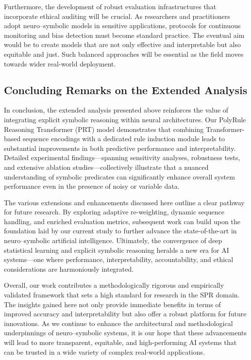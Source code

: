 \documentclass{article}
\begin{document}
Furthermore, the development of robust evaluation infrastructures that incorporate ethical auditing will be crucial. As researchers and practitioners adopt neuro–symbolic models in sensitive applications, protocols for continuous monitoring and bias detection must become standard practice. The eventual aim would be to create models that are not only effective and interpretable but also equitable and just. Such balanced approaches will be essential as the field moves towards wider real-world deployment.

\subsection*{Concluding Remarks on the Extended Analysis}
In conclusion, the extended analysis presented above reinforces the value of integrating explicit symbolic reasoning within neural architectures. Our PolyRule Reasoning Transformer (PRT) model demonstrates that combining Transformer-based sequence encodings with a dedicated rule induction module leads to substantial improvements in both predictive performance and interpretability. Detailed experimental findings—spanning sensitivity analyses, robustness tests, and extensive ablation studies—collectively illustrate that a nuanced understanding of symbolic predicates can significantly enhance overall system performance even in the presence of noisy or variable data.

The various extensions and enhancements discussed here outline a clear pathway for future research. By exploring adaptive re-weighting, dynamic sequence handling, and enriched evaluation metrics, subsequent work can build upon the foundation laid by our current study to further advance the state-of-the-art in neuro–symbolic artificial intelligence. Ultimately, the convergence of deep statistical learning and explicit symbolic reasoning heralds a new era for AI systems—one where performance, interpretability, accountability, and ethical considerations are harmoniously integrated.

\vspace{1em}
Overall, our work contributes a methodologically rigorous and empirically validated framework that sets a high standard for research in the SPR domain. The insights gained here not only provide immediate benefits in terms of improved accuracy and interpretability but also offer a robust platform for future innovations. As we continue to enhance the architectural and methodological underpinnings of neuro–symbolic systems, it is our hope that these advancements will lead to more transparent, equitable, and high-performing AI systems that can be trusted in a wide variety of complex real-world applications.
\end{document}
